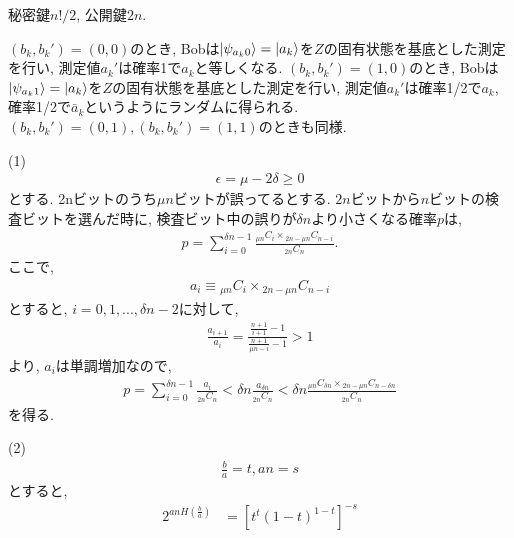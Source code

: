 \begin{ex}
    \label{ex12.25}
    秘密鍵$n!/2$, 公開鍵$2n$.
\end{ex}

\begin{ex}
    \label{ex12.26}
    $(b_k,b_k') = (0,0)$のとき, Bobは$\ket{\psi_{{a_k}0}} = \ket{a_k}$を$Z$の固有状態を基底とした測定を行い, 測定値$a_k'$は確率1で$a_k$と等しくなる. $(b_k,b_k') = (1,0)$のとき, Bobは$\ket{\psi_{{a_k}1}} = \ket{a_k}$を$Z$の固有状態を基底とした測定を行い, 測定値$a_k'$は確率1/2で$a_k$, 確率1/2で$\bar{a}_k$というようにランダムに得られる. $(b_k,b_k') = (0,1),(b_k,b_k') = (1,1)$のときも同様.
\end{ex}

\begin{ex}
    \label{ex12.27}
    (1) \
    \begin{align*}
        \epsilon = \mu - 2 \delta \ge 0
    \end{align*}
    とする. 2nビットのうち$\mu n$ビットが誤ってるとする. $2n$ビットから$n$ビットの検査ビットを選んだ時に, 検査ビット中の誤りが$\delta n$より小さくなる確率$p$は,
    \begin{align*}
        p = \sum_{i=0}^{\delta n - 1} \frac{{}_{\mu n} C _{i} \times {}_{2n - \mu n} C _{n - i}}{{}_{2n} C_n}.
    \end{align*}
    ここで,
    \begin{align*}
        a_i \equiv {}_{\mu n} C _{i} \times {}_{2n - \mu n} C _{n - i}
    \end{align*}
    とすると, $i = 0, 1, ..., \delta n - 2$に対して,
    \begin{align*}
        \frac{a_{i+1}}{a_i} = \frac{
            \frac{n+1}{i+1} - 1
        }{
            \frac{n+1}{\mu n - i } - 1
        }
        > 1
    \end{align*}
    より, $a_i$は単調増加なので,
    \begin{align*}
        p =
        \sum_{i=0}^{\delta n - 1} \frac{a_i}{{}_{2n} C_n} <
        \delta n \frac{a_{\delta n}}{{}_{2n} C_n} <
        \delta n
        \frac{{}_{\mu n} C _{\delta n} \times {}_{2n - \mu n} C _{n - \delta n}}{{}_{2n} C_n}
    \end{align*}
    を得る.
    \par
    (2)\
    \begin{align*}
        \frac{b}{a} = t, an = s
    \end{align*}
    とすると,
    \begin{align*}
        2^{an H \left( \frac{b}{a}\right)} & = \left[ t^{t} (1-t)^{1-t}\right]^{-s} \\

\end{align*}
\end{ex}
